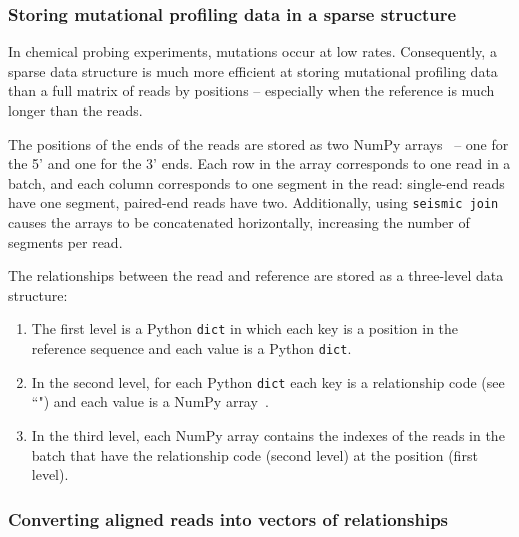 \documentclass[11pt]{article}
\begin{document}
\subsubsection{Storing mutational profiling data in a sparse structure}

In chemical probing experiments, mutations occur at low rates.
Consequently, a sparse data structure is much more efficient at storing mutational profiling data than a full matrix of reads by positions -- especially when the reference is much longer than the reads.

The positions of the ends of the reads are stored as two NumPy arrays~\cite{Harris2020} -- one for the 5' and one for the 3' ends.
Each row in the array corresponds to one read in a batch, and each column corresponds to one segment in the read: single-end reads have one segment, paired-end reads have two. 
Additionally, using \verb|seismic join| causes the arrays to be concatenated horizontally, increasing the number of segments per read.

The relationships between the read and reference are stored as a three-level data structure:
\begin{enumerate}
    \item The first level is a Python \verb|dict| in which each key is a position in the reference sequence and each value is a Python \verb|dict|.
    \item In the second level, for each Python \verb|dict| each key is a relationship code (see ``") and each value is a NumPy array~\cite{Harris2020}.
    \item In the third level, each NumPy array contains the indexes of the reads in the batch that have the relationship code (second level) at the position (first level).
\end{enumerate}

\subsubsection{Converting aligned reads into vectors of relationships}
\label{relationship-vector}
\end{document}
